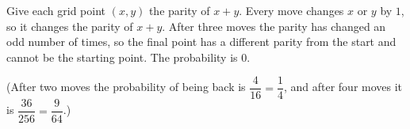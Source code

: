 Give each grid point $(x,y)$ the parity of $x+y$. Every move changes $x$ or $y$ by $1$, so it changes the parity of $x+y$. After three moves the parity has changed an odd number of times, so the final point has a different parity from the start and cannot be the starting point. The probability is $\boxed{0}$.

(After two moves the probability of being back is $\dfrac{4}{16}=\dfrac{1}{4}$, and after four moves it is $\dfrac{36}{256}=\dfrac{9}{64}$.)
